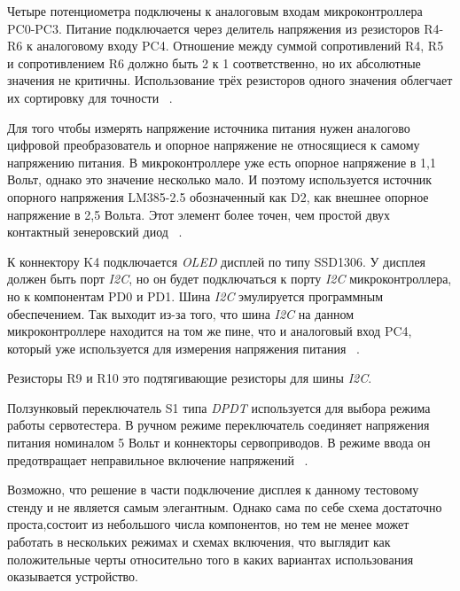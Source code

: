 Четыре потенциометра подключены к аналоговым входам микроконтроллера
PC0-PC3. Питание подключается через делитель напряжения из резисторов
R4-R6 к аналоговому входу PC4. Отношение между суммой сопротивлений
R4, R5 и сопротивлением R6 должно быть 2 к 1 соответственно, но их
абсолютные значения не критичны. Использование трёх резисторов одного
значения облегчает их сортировку для точности ~\cite{Elector521}.

Для того чтобы измерять напряжение источника питания нужен аналогово
цифровой преобразователь и опорное напряжение не относящиеся к самому
напряжению питания.  В микроконтроллере уже есть опорное напряжение в
1,1 Вольт, однако это значение несколько мало. И поэтому используется
источник опорного напряжения LM385-2.5 обозначенный как D2, как
внешнее опорное напряжение в 2,5 Вольта. Этот элемент более точен, чем
простой двух контактный зенеровский диод ~\cite{Elector521}.

К коннектору K4 подключается \textit{OLED} дисплей по типу SSD1306.  У
дисплея должен быть порт \textit{I2C}, но он будет подключаться к
порту \textit{I2C} микроконтроллера, но к компонентам PD0 и PD1. Шина
\textit{I2C} эмулируется программным обеспечением. Так выходит из-за
того, что шина \textit{I2C} на данном микроконтроллере находится на
том же пине, что и аналоговый вход PC4, который уже используется для
измерения напряжения питания ~\cite{Elector521}.

Резисторы R9 и R10 это подтягивающие резисторы для шины \textit{I2C}.

Ползунковый переключатель S1 типа \textit{DPDT} используется для
выбора режима работы сервотестера. В ручном режиме переключатель
соединяет напряжения питания номиналом 5 Вольт и коннекторы
сервоприводов. В режиме ввода он предотвращает неправильное включение
напряжений ~\cite{Elector521}.

Возможно, что решение в части подключение дисплея к данному тестовому
стенду и не является самым элегантным. Однако сама по себе схема
достаточно проста,состоит из небольшого числа компонентов, но тем не
менее может работать в нескольких режимах и схемах включения, что
выглядит как положительные черты относительно того в каких вариантах
использования оказывается устройство.
